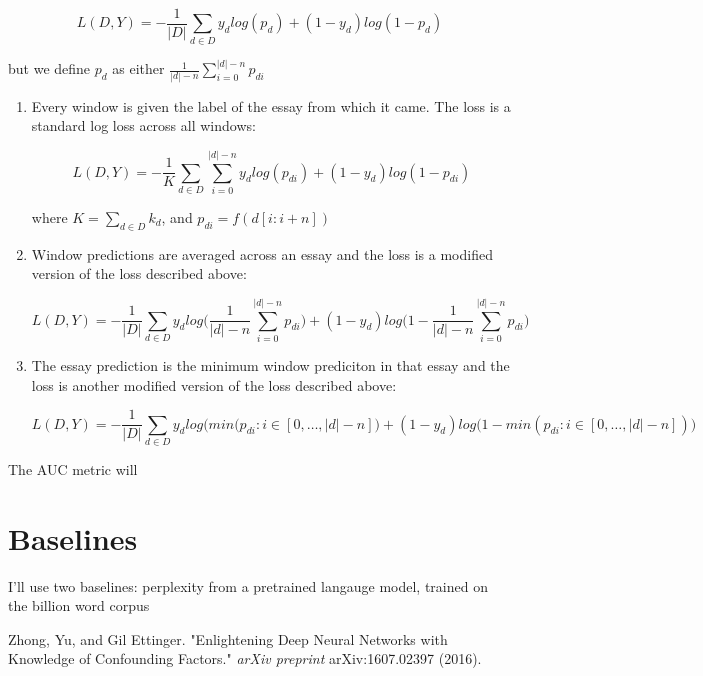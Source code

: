 \documentclass[12pt]{article}
\begin{document}
$$L(D, Y) = -\frac{1}{|D|} \sum_{d \in D}  y_d log(p_d) + (1 - y_d) log(1 - p_d) $$

but we define $p_d$ as either $\frac{1}{|d| - n}\sum_{i=0}^{|d| - n} p_{di}$
\begin{enumerate}
    \item Every window is given the label of the essay from which it came. The
    loss is a standard log loss across all windows:

    $$L(D, Y) = -\frac{1}{K} \sum_{d \in D} \sum_{i=0}^{|d| - n} y_d log(p_{di}) + (1 - y_d) log(1 - p_{di}) $$

    where $K = \sum_{d \in D} k_d$, and $p_{di} = f(d[i:i + n])$
    \item Window predictions are averaged across an essay and the loss is a
    modified version of the loss described above:

    $$L(D, Y) = -\frac{1}{|D|} \sum_{d \in D} y_d log\Big(\frac{1}{|d| - n}\sum_{i=0}^{|d| - n} p_{di}\Big) + (1 - y_d) log\Big(1 - \frac{1}{|d| - n}\sum_{i=0}^{|d| - n} p_{di}\Big) $$

    \item The essay prediction is the minimum window prediciton in that essay
    and the loss is another modified version of the loss described above:

    $$L(D, Y) = -\frac{1}{|D|} \sum_{d \in D} y_d log\Big(min(p_{di} : i \in [0, \dots, |d| - n]\Big) + (1 - y_d) log\Big(1 - min(p_{di} : i \in [0, \dots, |d| - n])\Big) $$

\end{enumerate}

The AUC metric will

\section*{Baselines}
I'll use two baselines: perplexity from a pretrained langauge model,
trained on the billion word corpus

\begin{thebibliography}{1}

    Zhong, Yu, and Gil Ettinger.
    "Enlightening Deep Neural Networks with Knowledge of Confounding Factors."
    \emph{arXiv preprint} arXiv:1607.02397 (2016).
\end{thebibliography}
\end{document}
